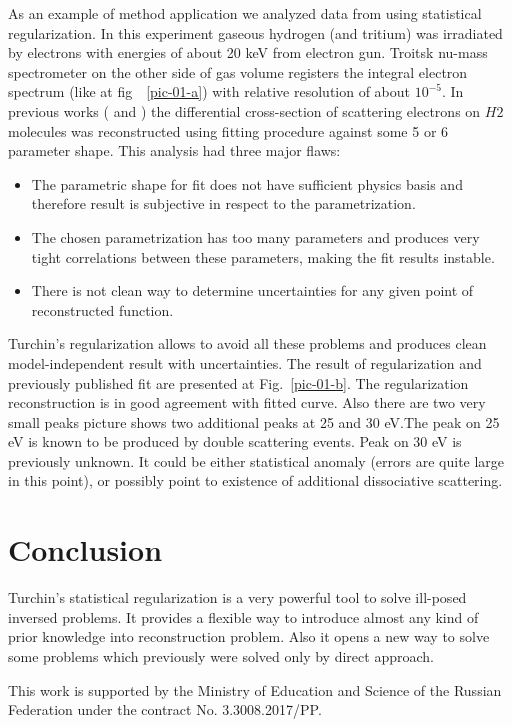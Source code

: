 \documentclass{webofc}
\begin{document}
As an example of method application we analyzed data from \cite{Abdurashitov:2016nrv} using statistical regularization. In this experiment gaseous hydrogen (and tritium)  was irradiated by electrons with energies of about 20 keV from electron gun. Troitsk nu-mass spectrometer on the other side of gas volume registers the integral electron spectrum (like at fig~~\ref{pic-01-a}) with relative resolution of about $10^{-5}$. In previous works (\cite{Aseev2000} and \cite{Abdurashitov:2016nrv}) the differential cross-section of scattering electrons on $H2$ molecules was reconstructed using fitting procedure against some 5 or 6 parameter shape. This analysis had three major flaws:
\begin{itemize}
\item The parametric shape for fit does not have sufficient physics basis and therefore result is subjective in respect to the parametrization.
\item The chosen parametrization has too many parameters and produces very tight correlations between these parameters, making the fit results instable.
\item There is not clean way to determine uncertainties for any given point of reconstructed function.
\end{itemize}

Turchin's regularization allows to avoid all these problems and produces clean model-independent result with uncertainties. The result of regularization and previously published fit are presented at Fig.~\ref{pic-01-b}. The regularization reconstruction is in good agreement with fitted curve. Also there are two very small peaks picture shows two additional peaks at 25 and 30 eV.The peak on 25 eV is known to be produced by double scattering events. Peak on 30 eV is previously unknown. It could be either statistical anomaly (errors are quite large in this point), or possibly point to existence of additional dissociative scattering.

\section{Conclusion}

Turchin's statistical regularization is a very powerful tool to solve ill-posed inversed problems. It provides a flexible way to introduce almost any kind of prior knowledge into reconstruction problem. Also it opens a new way to solve some problems which previously were solved only by direct approach.

This work is supported by the Ministry of Education and Science of the Russian Federation under the contract No. 3.3008.2017/PP.

    
{}        
 
\end{document}
